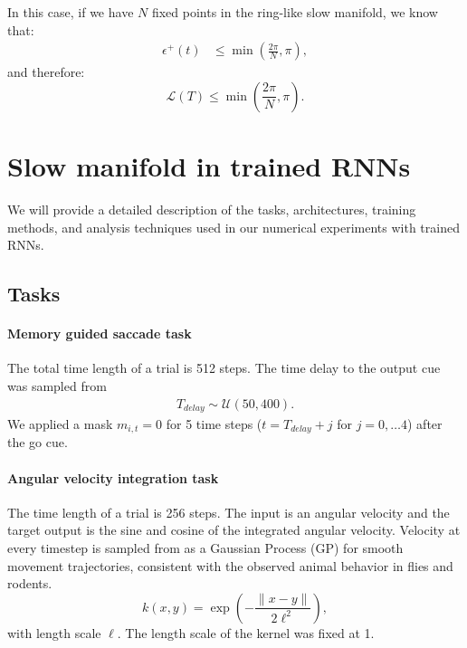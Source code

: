 \documentclass{article} %
\newcounter{ct}
\theoremstyle{definition}
\theoremstyle{remark}
\begin{document}
In this case, if we have \(N\) fixed points in the ring-like slow manifold, we know that:
\begin{equation}
\begin{split}
     \epsilon^+(t) &\leq \min \left( \frac{2 \pi}{N}, \pi \right),
\end{split}
\end{equation}and therefore:
\begin{equation}
    \mathcal{L}(T) \leq \min \left( \frac{2 \pi}{N}, \pi \right).
\end{equation}
\newpage
\section{Slow manifold in trained RNNs}
We will provide a detailed description of the tasks, architectures, training methods, and analysis techniques used in our numerical experiments with trained RNNs.
\subsection{Tasks}\label{sec:supp:tasks}
\paragraph{Memory guided saccade task}

The total time length of a trial is 512 steps.
The time delay to the output cue was sampled from
\begin{align}
T_{delay} \sim \mathcal{U}(50, 400).
\end{align}We applied a mask \(m_{i, t}=0\) for 5 time steps (\(t = T_{delay}+j\) for \(j = 0,\dots 4\)) after the go cue.



\paragraph{Angular velocity integration task}
The time length of a trial is 256 steps.
The input is an angular velocity and the target output is the sine and cosine of the integrated angular velocity.
Velocity at every timestep  is sampled from as a Gaussian Process (GP) for smooth movement trajectories, consistent with the observed animal behavior in flies and rodents.
\begin{equation}
k(x, y)=\exp\left(-\frac{\|x - y\|}{2\ell^{2}}\right),
\end{equation}with length scale \(\ell\).
 The length scale of the kernel was fixed at 1.
\end{document}
